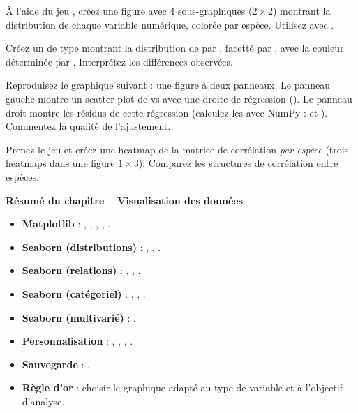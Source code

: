 \begin{exercice}[$\star\star$]
\`A l'aide du jeu , cr\'eez une figure avec 4 sous-graphiques ($2 \times 2$) montrant la distribution de chaque variable num\'erique, color\'ee par esp\`ece. Utilisez  avec .
\end{exercice}

\begin{exercice}[$\star\star$]
Cr\'eez un  de type  montrant la distribution de  par , facett\'e par , avec la couleur d\'etermin\'ee par . Interpr\'etez les diff\'erences observ\'ees.
\end{exercice}

\begin{exercice}[$\star\star\star$]
Reproduisez le graphique suivant : une figure \`a deux panneaux. Le panneau gauche montre un scatter plot de  vs  avec une droite de r\'egression (). Le panneau droit montre les r\'esidus de cette r\'egression (calculez-les avec NumPy :  et ). Commentez la qualit\'e de l'ajustement.
\end{exercice}

\begin{exercice}[$\star\star\star$]
Prenez le jeu  et cr\'eez une heatmap de la matrice de corr\'elation \emph{par esp\`ece} (trois heatmaps dans une figure $1 \times 3$). Comparez les structures de corr\'elation entre esp\`eces.
\end{exercice}

\begin{formules}
\textbf{R\'esum\'e du chapitre -- Visualisation des donn\'ees}
\begin{itemize}
    \item \textbf{Matplotlib} : , , , , .
    \item \textbf{Seaborn (distributions)} : , , .
    \item \textbf{Seaborn (relations)} : , , .
    \item \textbf{Seaborn (cat\'egoriel)} : , , .
    \item \textbf{Seaborn (multivari\'e)} : .
    \item \textbf{Personnalisation} : , , , .
    \item \textbf{Sauvegarde} : .
    \item \textbf{R\`egle d'or} : choisir le graphique adapt\'e au type de variable et \`a l'objectif d'analyse.
\end{itemize}
\end{formules}
